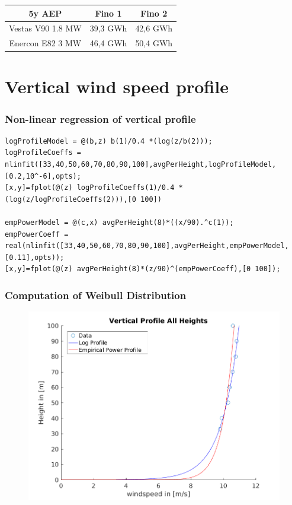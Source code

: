 \documentclass[12pt,t]{beamer}
\begin{document}
\begin{frame}
\begin{figure}[htbp]
\begin{center}
\begin{minipage}[t]{0.45\linewidth}
		\end{minipage}
	\end{center}
\end{figure}
\begin{tabular}{c| c| c}
			5y AEP 	& Fino 1 & Fino 2 \\ 
				\hline
			Vestas V90 1.8 MW & 39,3 GWh & 42,6 GWh \\
			\hline
			Enercon E82 3 MW& 46,4 GWh & 50,4 GWh \\
			\end{tabular}
\end{frame}


\section{Vertical wind speed profile}

\begin{frame}[fragile]
\frametitle{Non-linear regression of vertical profile}
\vspace{40 pt}
\begin{lstlisting}
logProfileModel = @(b,z) b(1)/0.4 *(log(z/b(2)));
logProfileCoeffs = nlinfit([33,40,50,60,70,80,90,100],avgPerHeight,logProfileModel,[0.2,10^-6],opts);
[x,y]=fplot(@(z) logProfileCoeffs(1)/0.4 *(log(z/logProfileCoeffs(2))),[0 100])

empPowerModel = @(c,x) avgPerHeight(8)*((x/90).^c(1));
empPowerCoeff = real(nlinfit([33,40,50,60,70,80,90,100],avgPerHeight,empPowerModel,[0.11],opts));
[x,y]=fplot(@(z) avgPerHeight(8)*(z/90)^(empPowerCoeff),[0 100]);
\end{lstlisting}
\end{frame}

\begin{frame}[fragile]
\frametitle{Computation of Weibull Distribution}
\begin{figure}[H]
\centering
\includegraphics[width=0.8\linewidth]{../../figures/verticalProfileFits.png}
\label{fig:weatherpattern}
\end{figure}
\end{frame}
\end{document}
